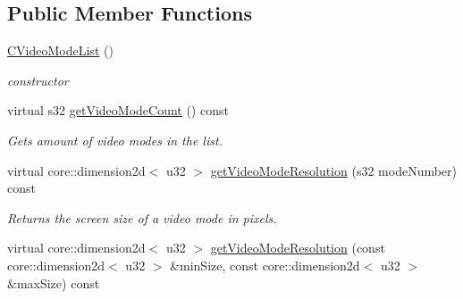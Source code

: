 \subsection*{Public Member Functions}
\begin{DoxyCompactItemize}
\item 
\hypertarget{classirr_1_1video_1_1_c_video_mode_list_a305ed9f8bd3aad80e0f7f898c06ce744}{\hyperlink{classirr_1_1video_1_1_c_video_mode_list_a305ed9f8bd3aad80e0f7f898c06ce744}{C\-Video\-Mode\-List} ()}\label{classirr_1_1video_1_1_c_video_mode_list_a305ed9f8bd3aad80e0f7f898c06ce744}

\begin{DoxyCompactList}\small\item\em constructor \end{DoxyCompactList}\item 
\hypertarget{classirr_1_1video_1_1_c_video_mode_list_ad4b9d90f6cb2b6a0fcc9dc3b6fc97a46}{virtual s32 \hyperlink{classirr_1_1video_1_1_c_video_mode_list_ad4b9d90f6cb2b6a0fcc9dc3b6fc97a46}{get\-Video\-Mode\-Count} () const }\label{classirr_1_1video_1_1_c_video_mode_list_ad4b9d90f6cb2b6a0fcc9dc3b6fc97a46}

\begin{DoxyCompactList}\small\item\em Gets amount of video modes in the list. \end{DoxyCompactList}\item 
\hypertarget{classirr_1_1video_1_1_c_video_mode_list_ae2aa7d20e3a5853d4d464eb7a9e4a12c}{virtual core\-::dimension2d$<$ u32 $>$ \hyperlink{classirr_1_1video_1_1_c_video_mode_list_ae2aa7d20e3a5853d4d464eb7a9e4a12c}{get\-Video\-Mode\-Resolution} (s32 mode\-Number) const }\label{classirr_1_1video_1_1_c_video_mode_list_ae2aa7d20e3a5853d4d464eb7a9e4a12c}

\begin{DoxyCompactList}\small\item\em Returns the screen size of a video mode in pixels. \end{DoxyCompactList}\item 
\hypertarget{classirr_1_1video_1_1_c_video_mode_list_a787cfe9552bdd9645b1d4ea6fc892a1a}{virtual core\-::dimension2d$<$ u32 $>$ \hyperlink{classirr_1_1video_1_1_c_video_mode_list_a787cfe9552bdd9645b1d4ea6fc892a1a}{get\-Video\-Mode\-Resolution} (const core\-::dimension2d$<$ u32 $>$ \&min\-Size, const core\-::dimension2d$<$ u32 $>$ \&max\-Size) const }\label{classirr_1_1video_1_1_c_video_mode_list_a787cfe9552bdd9645b1d4ea6fc892a1a}


\end{DoxyCompactItemize}
